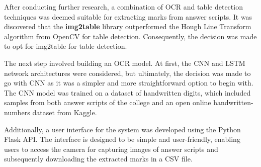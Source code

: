 \noindent
After conducting further research, a combination of OCR and table detection techniques was deemed suitable for extracting marks from answer scripts. It was discovered that the \textbf{img2table} library outperformed the Hough Line Transform algorithm from OpenCV for table detection. Consequently, the decision was made to opt for img2table for table detection.

\noindent
The next step involved building an OCR model. At first, the CNN and LSTM network architectures were considered, but ultimately, the decision was made to go with CNN as it was a simpler and more straightforward option to begin with. The CNN model was trained on a dataset of handwritten digits, which included samples from both answer scripts of the college and an open online handwritten-numbers dataset from Kaggle.

\noindent
Additionally, a user interface for the system was developed using the Python Flask API. The interface is designed to be simple and user-friendly, enabling users to access the camera for capturing images of answer scripts and subsequently downloading the extracted marks in a CSV file.
